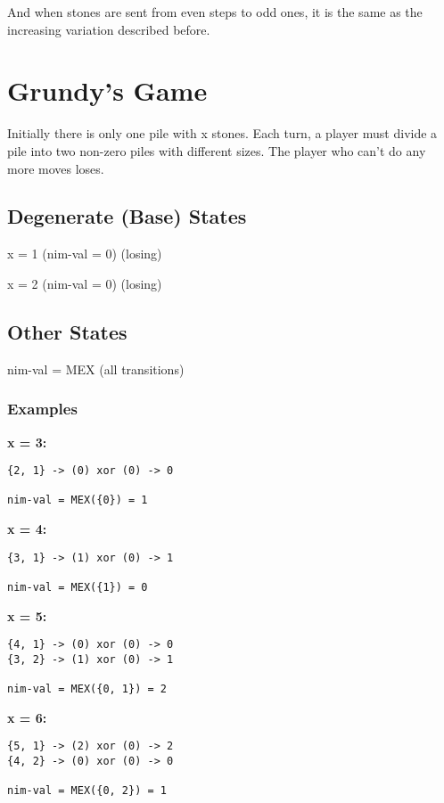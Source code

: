 And when stones are sent from even steps to odd ones, it is the same as the increasing variation described before.

\section{Grundy's Game}

Initially there is only one pile with x stones.
Each turn, a player must divide a pile into two non-zero piles with different sizes.
The player who can't do any more moves loses.

\subsection{Degenerate (Base) States}

x = 1 (nim-val = 0) (losing)

x = 2 (nim-val = 0) (losing)

\subsection{Other States}

nim-val = MEX (all transitions)

\subsubsection{Examples}

\textbf{x = 3:}
\begin{lstlisting}
{2, 1} -> (0) xor (0) -> 0

nim-val = MEX({0}) = 1
\end{lstlisting}

\textbf{x = 4:}
\begin{lstlisting}
{3, 1} -> (1) xor (0) -> 1

nim-val = MEX({1}) = 0
\end{lstlisting}

\textbf{x = 5:}
\begin{lstlisting}
{4, 1} -> (0) xor (0) -> 0
{3, 2} -> (1) xor (0) -> 1

nim-val = MEX({0, 1}) = 2
\end{lstlisting}

\textbf{x = 6:}
\begin{lstlisting}
{5, 1} -> (2) xor (0) -> 2
{4, 2} -> (0) xor (0) -> 0
    
nim-val = MEX({0, 2}) = 1
\end{lstlisting}

